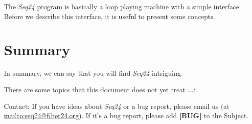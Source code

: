 \documentclass[
 11pt,
 twoside,
 a4paper,
 headinclude,
 footinclude,
 final                                 %
]{article}
\begin{document}
   The \textsl{Seq24} program is basically a loop playing machine with a 
   simple interface.  Before we describe this interface, it is useful to
   present some concepts.


























% 

\section{Summary}
\label{sec:summary}

   In summary, we can say that you will find \textsl{Seq24} intriguing.

   There are some topics that this document does not yet treat ...:

   Contact: If you have ideas about \textsl{Seq24} or a bug report, please
   email us (at \url{mailto:seq24@filter24.org}).
   If it's a bug report, please add \textbf{[BUG]} to the Subject.




\printindex
\end{document}
